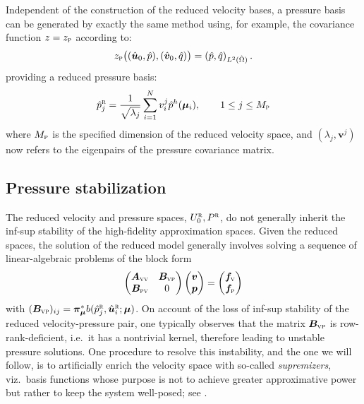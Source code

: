 \documentclass[onecolumn, twoside, a4paper, 11pt]{article}
\begin{document}
Independent of the construction of the reduced velocity bases, a pressure basis can
be generated by exactly the same method using, for example, the covariance function
$z=z_\textsc{p}$ according to:
%
\begin{equation}
z_\textsc{p}\big((\hat{\bm u}_0, \hat{p}), (\hat{\bm v}_0, \hat{q})\big) =
  \left( \hat{p}, \hat{q} \right)_{L^2(\hat{\Omega})}.
\end{equation}
%
providing a reduced pressure basis:
%
\begin{equation}
  \hat{p}^\textsc{r}_j = \frac{1}{\sqrt{\lambda_j}} \sum_{i=1}^N v^{j}_i \hat{p}^h(\bm{\mu}_i),
  \qquad 1 \leq j \leq M_\textsc{p}
\end{equation}
%
where $M_\textsc{p}$ is the specified dimension of the reduced velocity space, and $(\lambda_j,\bm{v}^j)$ now
refers to the eigenpairs of the pressure covariance matrix.


\subsection{Pressure stabilization}
\label{sec:stab}
The reduced velocity and pressure spaces, $U_0^{\textsc{r}},P^{\textsc{r}}$, do not generally inherit the
inf-sup stability of the high-fidelity approximation spaces. Given the reduced spaces, the solution of
the reduced model generally involves solving a sequence of linear-algebraic problems of the block form
%
\begin{equation}
  \label{eqn:sys-instab}
  \begin{pmatrix} \bm A_\textsc{vv} & \bm B_\textsc{vp} \\ \bm B_\textsc{pv} & 0\end{pmatrix}
  \begin{pmatrix} \bm v \\ \bm p \end{pmatrix}
  =
  \begin{pmatrix} \bm f_\textsc{v} \\ \bm f_\textsc{p} \end{pmatrix}
\end{equation}
%
with $(\bm B_\textsc{vp})_{ij}=\bm{\pi}^*_{\bm{\mu}}b(\hat{p}_j^\textsc{r},\hat{\bm{u}}_i^\textsc{r};\bm{\mu})$.
On account of the loss of inf-sup stability of the reduced velocity-pressure pair,
one typically observes that the matrix $\bm B_\textsc{vp}$ is row-rank-deficient, i.e.~it
has a nontrivial kernel, therefore leading to unstable pressure solutions. One procedure to resolve this
instability, and the one we will follow, is to artificially enrich the velocity space with so-called
\emph{supremizers}, viz.~basis functions whose purpose is not to achieve greater approximative power but
rather to keep the system well-posed; see \cite{Ballarin2015ssp}.
\end{document}
